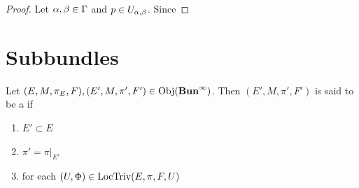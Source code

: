 \documentclass{book}
\begin{document}
	\begin{proof}
		Let $\alpha, \beta \in \Gamma$ and $p \in U_{\alpha, \beta}$. Since 
	\end{proof}

	
	
	









	
	
	
	
	
	
	
	
	
	
	
	
	
	
	
	
	
	
	

	
	
	
	
	
	
	
	
	
	
	
	
	
	
	
	
	
	
	
	
	
	
	
	
	\newpage
	\section{Subbundles}
	
	\begin{defn}
		Let $(E, M, \pi_E, F), (E', M, \pi', F') \in \operatorname{Obj}(\operatorname*{\text{\textbf{Bun}}^{\infty}})$. Then $(E', M, \pi', F')$ is said to be a  if 
		\begin{enumerate}
			\item $E' \subset E$
			\item $\pi' = \pi|_{E'}$
			\item for each $(U, \Phi) \in \text{LocTriv}(E, \pi, F, U)$
		\end{enumerate}
	\end{defn}
	
	
	
	

	
	
	
\end{document}
